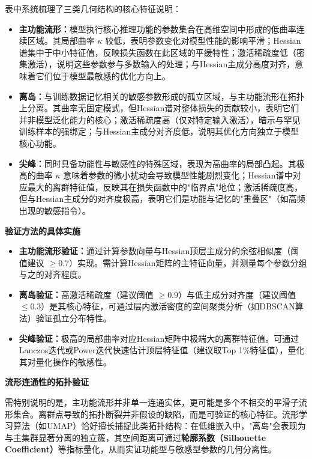 \documentclass[letterpaper,twocolumn,10pt]{article}
\begin{document}
表中系统梳理了三类几何结构的核心特征说明：

\begin{itemize}
\item \textbf{主功能流形：}模型执行核心推理功能的参数集合在高维空间中形成的低曲率连续区域。其局部曲率 $\kappa$ 较低，表明参数变化对模型性能的影响平滑；Hessian谱集中于中小特征值，反映损失函数在此区域的平缓特性；激活稀疏度低（密集激活），说明这些参数参与多数输入的处理；与Hessian主成分高度对齐，意味着它们位于模型最敏感的优化方向上。

\item \textbf{离岛：}与训练数据记忆相关的敏感参数形成的孤立区域，与主功能流形在拓扑上分离。其曲率无固定模式，但Hessian谱对整体损失的贡献较小，表明它们并非模型泛化能力的核心；激活稀疏度高（仅对特定输入激活），暗示与罕见训练样本的强绑定；与Hessian主成分对齐度低，说明其优化方向独立于模型核心功能。

\item \textbf{尖峰：}同时具备功能性与敏感性的特殊区域，表现为高曲率的局部凸起。其极高的曲率 $\kappa$ 意味着参数的微小扰动会导致模型性能剧烈变化；Hessian谱中对应最大的离群特征值，反映其在损失函数中的"临界点"地位；激活稀疏度高，但与Hessian主成分的对齐度极高，表明它们是功能与记忆的"重叠区"（如高频出现的敏感指令）。
\end{itemize}

\textbf{验证方法的具体实施}

\begin{itemize}
\item \textbf{主功能流形验证：}通过计算参数向量与Hessian顶层主成分的余弦相似度（阈值建议 $\geq 0.7$）实现。需计算Hessian矩阵的主特征向量，并测量每个参数分组与之的对齐程度。

\item \textbf{离岛验证：}高激活稀疏度（建议阈值 $\geq 0.9$）与低主成分对齐度（建议阈值 $\leq 0.3$）是其核心特征，可通过层内激活密度的空间聚类分析（如DBSCAN算法）验证孤立分布特性。

\item \textbf{尖峰验证：}极高的局部曲率对应Hessian矩阵中极端大的离群特征值。可通过Lanczos迭代或Power迭代快速估计顶层特征值（建议取Top 1\%特征值），量化其对量化操作的敏感性。
\end{itemize}

\textbf{流形连通性的拓扑验证}

需特别说明的是，主功能流形并非单一连通实体，更可能是多个不相交的平滑子流形集合。离群点导致的拓扑断裂并非假设的缺陷，而是可验证的核心特征。流形学习算法（如UMAP）恰好擅长捕捉此类拓扑结构：在低维嵌入中，"离岛"会表现为与主集群显著分离的独立簇，其空间距离可通过\textbf{轮廓系数（Silhouette Coefficient）}等指标量化，从而实证功能型与敏感型参数的几何分离性。
\end{document}
